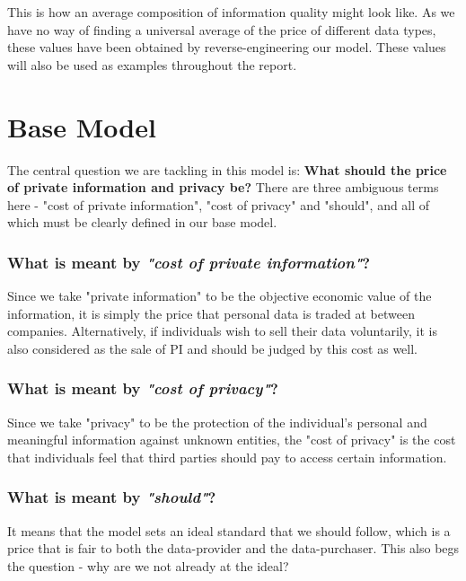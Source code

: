 \documentclass{icmmcm}
\begin{document}




\noindent
This is how an average composition of information quality might look like. 
As we have no way of finding a universal average of the price of different data types, these values have been obtained by reverse-engineering our model. 
These values will also be used as examples throughout the report.

\section{Base Model}
The central question we are tackling in this model is: \textbf{What should the price of private information and privacy be?} There are three ambiguous terms here - "cost of private information", "cost of privacy" and "should", and all of which must be clearly defined in our base model. 

\subsubsection*{What is meant by \textit{"cost of private information"}?} Since we take "private information" to be the objective economic value of the information, it is simply the price that personal data is traded at between companies. Alternatively, if individuals wish to sell their data voluntarily, it is also considered as the sale of PI and should be judged by this cost as well.

\subsubsection*{What is meant by \textit{"cost of privacy"}?} Since we take "privacy" to be the protection of the individual's personal and meaningful information against unknown entities, the "cost of privacy" is the cost that individuals feel that third parties should pay to access certain information. 

\subsubsection*{What is meant by \textit{"should"}?} It means that the model sets an ideal standard that we should follow, which is a price that is fair to both the data-provider and the data-purchaser. This also begs the question - why are we not already at the ideal?
\end{document}
